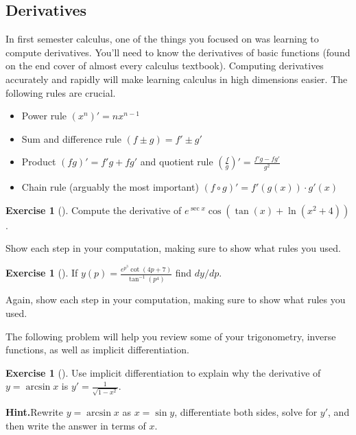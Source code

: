 \documentclass[10pt,]{book}
\theoremstyle{plain}
\theoremstyle{definition}
\theoremstyle{definition}
\theoremstyle{definition}
\theoremstyle{definition}
\newtheorem{exploration}[project]{Exercise}
\theoremstyle{definition}
\numberwithin{equation}{section}
\newcommand{\ds}{\displaystyle}
\begin{document}
\subsection[{Derivatives}]{Derivatives}\label{subsection-2}
In first semester calculus, one of the things you focused on was learning to compute derivatives. You'll need to know the derivatives of basic functions (found on the end cover of almost every calculus textbook). Computing derivatives accurately and rapidly will make learning calculus in high dimensions easier. The following rules are crucial. \leavevmode%
\begin{itemize}[label=\textbullet]
\item{}Power rule {\((x^n)' = nx^{n-1}\)}%
\item{}Sum and difference rule {\((f\pm g) = f'\pm g'\)}%
\item{}Product {\((fg)' = f' g + fg'\)} and quotient rule  {\(\ds\left(\frac f g\right)' = \frac{f' g - fg'}{g^2}\)}%
\item{}Chain rule (arguably the most important) {\((f\circ g)' = f'(g(x))\cdot g'(x)\)}%
\end{itemize}
%
\begin{exploration}[]\label{exploration-2}
Compute the derivative of \(e^{\sec x}\cos(\tan(x)+\ln(x^2+4))\).%
\par
Show each step in your computation, making sure to show what rules you used.%
\end{exploration}
\begin{exploration}[]\label{exploration-3}
If \(y(p) = \ds \frac{e^{p^3}\cot(4p+7)}{\tan^{-1}(p^4)}\) find \(dy/dp\).%
\par
Again, show each step in your computation, making sure to show what rules you used.%
\end{exploration}
The following problem will help you review some of your trigonometry, inverse functions, as well as implicit differentiation.%
\begin{exploration}[]\label{exploration-4}
Use implicit differentiation to explain why the derivative of \(y=\arcsin x\) is \(\ds y'=\frac{1}{\sqrt{1-x^2}}\).%
\par\medskip\noindent%
\textbf{Hint.}\quad Rewrite \(y=\arcsin x\) as \(x=\sin y\), differentiate both sides, solve for \(y'\), and then write the answer in terms of \(x\).%
\end{exploration}
\typeout{************************************************}
\typeout{************************************************}
\end{document}
